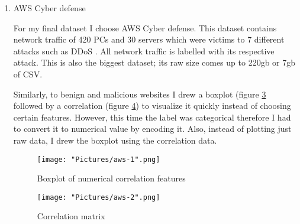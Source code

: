 \documentclass[11pt]{article}
\begin{document}
\begin{enumerate}
\begin{figure}[h!]
   \texttt{[image: "Pictures/malicious-benign-websites-1".png]}
   \caption{Boxplot of numerical features}
   \label{fig:websites-boxplot}
\end{figure}

  I also drew a correlation graph (figure \ref{fig:websites-corre}) since it can easily show what attributes are responsible for indicating that a website is malicious or not. However, its normally a set of features that indicate whether a website is malicious or not, not just one. Unforunately the correlation graph is unable to show this.

\begin{figure}[t!]
   \texttt{[image: "Pictures/malicious-benign-websites-2".png]}
   \caption{Correlation matrix}
   \label{fig:websites-corre}
\end{figure}

\newpage
  \item{AWS Cyber defense }
  
  For my final dataset I choose AWS Cyber defense. This dataset contains network traffic of 420 PCs and 30 servers which were victims to 7 different attacks such as DDoS \cite{bg-dataset-aws}. All network traffic is labelled with its respective attack. This is also the biggest dataset; its raw size comes up to 220gb or 7gb of CSV. 

  Similarly, to benign and malicious websites I drew a boxplot (figure \ref{fig:aws-boxplot} followed by a correlation (figure \ref{fig:aws-corre}) to visualize it quickly instead of choosing certain features. However, this time the label was categorical therefore I had to convert it to numerical value by encoding it. Also, instead of plotting just raw data, I drew the boxplot using the correlation data. 

\begin{figure}[t!]
   \texttt{[image: "Pictures/aws-1".png]}
   \caption{Boxplot of numerical correlation features}
   \label{fig:aws-boxplot}
\end{figure}

\begin{figure}[h!]
   \texttt{[image: "Pictures/aws-2".png]}
   \caption{Correlation matrix}
   \label{fig:aws-corre}
\end{figure}
\end{enumerate}
\end{document}
